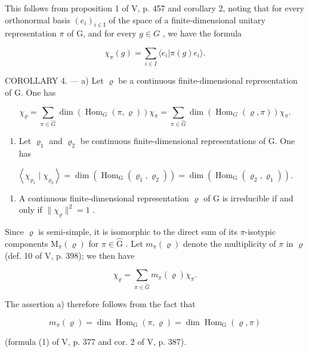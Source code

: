 This follows from proposition 1 of V, p. 457 and corollary 2, noting that for every orthonormal basis \((e_{i})_{i\in\mathrm{I}}\) of the space of a finite-dimensional unitary representation \(\pi\) of G, and for every \(g\in G\) , we have the formula

\[
\chi_ {\pi} (g) = \sum_ {i \in I} \langle e _ {i} | \pi (g) e _ {i} \rangle .
\]

COROLLARY 4. --- a) Let \(\varrho\) be a continuous finite-dimensional representation of G. One has

\[
\chi_ {\varrho} = \sum_ {\pi \in \widehat {G}} \dim (\operatorname{Hom} _ {G} (\pi , \varrho)) \chi_ {\pi} = \sum_ {\pi \in \widehat {G}} \dim (\operatorname{Hom} _ {G} (\varrho , \pi)) \chi_ {\pi}.
\]

\begin{enumerate}
\def\labelenumi{\alph{enumi})}
\setcounter{enumi}{1}
\tightlist
\item
  Let \(\varrho_{1}\) and \(\varrho_{2}\) be continuous finite-dimensional representations of G. One has
\end{enumerate}

\[
\left\langle \chi_ {\varrho_ {1}} \mid \chi_ {\varrho_ {2}} \right\rangle = \dim (\operatorname{Hom} _ {\mathrm{G}} (\varrho_ {1}, \varrho_ {2})) = \dim (\operatorname{Hom} _ {\mathrm{G}} (\varrho_ {2}, \varrho_ {1})).
\]

\begin{enumerate}
\def\labelenumi{\alph{enumi})}
\setcounter{enumi}{2}
\tightlist
\item
  A continuous finite-dimensional representation \(\varrho\) of G is irreducible if and only if \(\| \chi_{\varrho}\|^{2} = 1\) .
\end{enumerate}

Since \(\varrho\) is semi-simple, it is isomorphic to the direct sum of its \(\pi\)-isotypic components \(\mathrm{M}_{\pi}(\varrho)\) for \(\pi \in \widehat{\mathrm{G}}\) . Let \(m_{\pi}(\varrho)\) denote the multiplicity of \(\pi\) in \(\varrho\) (def. 10 of V, p. 398); we then have

\[
\chi_ {\varrho} = \sum_ {\pi \in \widehat {G}} m _ {\pi} (\varrho) \chi_ {\pi}.
\]

The assertion a) therefore follows from the fact that

\[
m _ {\pi} (\varrho) = \dim \operatorname{Hom} _ {\mathrm{G}} (\pi , \varrho) = \dim \operatorname{Hom} _ {\mathrm{G}} (\varrho , \pi)
\]

(formula (1) of V, p. 377 and cor. 2 of V, p. 387).

